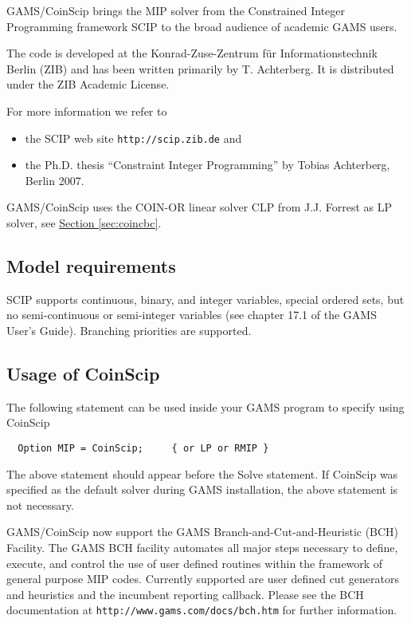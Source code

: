 GAMS/CoinScip brings the MIP solver from the Constrained Integer Programming framework SCIP to the broad audience of academic GAMS users.

The code is developed at the Konrad-Zuse-Zentrum f\"ur Informationstechnik Berlin (ZIB) and has been written primarily by T. Achterberg.
It is distributed under the ZIB Academic License.

For more information we refer to
\begin{itemize}
\item the SCIP web site \texttt{http://scip.zib.de} and
\item the Ph.D. thesis ``Constraint Integer Programming'' by Tobias Achterberg, Berlin 2007.
\end{itemize}

GAMS/CoinScip uses the COIN-OR linear solver CLP from J.J. Forrest as LP solver, see \hyperlink{sec:coincbc}{Section \ref{sec:coincbc}}.

\subsection{Model requirements}

SCIP supports continuous, binary, and integer variables, special ordered sets, but no semi-continuous or semi-integer variables (see chapter 17.1 of the GAMS User's Guide).
Branching priorities are supported.

\subsection{Usage of CoinScip}

The following statement can be used inside your GAMS program to specify using CoinScip
\begin{verbatim}
  Option MIP = CoinScip;     { or LP or RMIP }
\end{verbatim}

The above statement should appear before the Solve statement.
If CoinScip was specified as the default solver during GAMS installation, the above statement is not necessary.

GAMS/CoinScip now support the GAMS Branch-and-Cut-and-Heuristic (BCH) Facility.
The GAMS BCH facility automates all major steps necessary to define, execute, and control the use of user defined routines within the framework of general purpose MIP codes.
Currently supported are user defined cut generators and heuristics and the incumbent reporting callback.
Please see the BCH documentation at \texttt{http://www.gams.com/docs/bch.htm} for further information.

